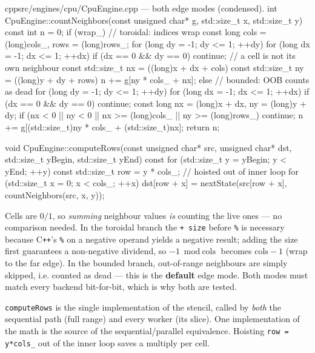 \documentclass[
	english,
	letterpaper, oneside
]{article}
\begin{document}
\begin{sourcecode}{cpp}{src/engines/cpu/CpuEngine.cpp --- both edge modes (condensed).}
int CpuEngine::countNeighbors(const unsigned char* g, std::size_t x,
                              std::size_t y) const {
  int n = 0;
  if (wrap_) {                                   // toroidal: indices wrap
    const long cols = (long)cols_, rows = (long)rows_;
    for (long dy = -1; dy <= 1; ++dy)
      for (long dx = -1; dx <= 1; ++dx) {
        if (dx == 0 && dy == 0) continue;        // a cell is not its own neighbour
        const std::size_t nx = ((long)x + dx + cols) %
        const std::size_t ny = ((long)y + dy + rows) %
        n += g[ny * cols_ + nx];
      }
  } else {                                       // bounded: OOB counts as dead
    for (long dy = -1; dy <= 1; ++dy)
      for (long dx = -1; dx <= 1; ++dx) {
        if (dx == 0 && dy == 0) continue;
        const long nx = (long)x + dx, ny = (long)y + dy;
        if (nx < 0 || ny < 0 || nx >= (long)cols_ || ny >= (long)rows_) continue;
        n += g[(std::size_t)ny * cols_ + (std::size_t)nx];
      }
  }
  return n;
}

void CpuEngine::computeRows(const unsigned char* src, unsigned char* dst,
                            std::size_t yBegin, std::size_t yEnd) const {
  for (std::size_t y = yBegin; y < yEnd; ++y) {
    const std::size_t row = y * cols_;           // hoisted out of inner loop
    for (std::size_t x = 0; x < cols_; ++x)
      dst[row + x] = nextState(src[row + x], countNeighbors(src, x, y));
  }
}
\end{sourcecode}

Cells are $0/1$, so \emph{summing} neighbour values \emph{is} counting the live
ones --- no comparison needed. In the toroidal branch the \texttt{+ size} before
\texttt{\%} is necessary because C\texttt{++}'s \texttt{\%} on a negative operand
yields a negative result; adding the size first guarantees a non-negative
dividend, so $-1 \bmod \text{cols}$ becomes $\text{cols}-1$ (wrap to the far
edge). In the bounded branch, out-of-range neighbours are simply skipped, i.e.
counted as dead --- this is the \textbf{default} edge mode. Both modes must match
every backend bit-for-bit, which is why both are tested.

\texttt{computeRows} is the single implementation of the stencil, called by
\emph{both} the sequential path (full range) and every worker (its slice). One
implementation of the math is the source of the sequential/parallel equivalence.
Hoisting \texttt{row = y*cols\_} out of the inner loop saves a multiply per cell.
\end{document}
